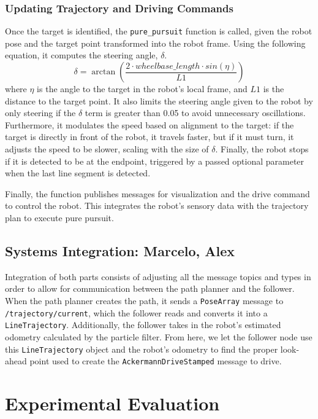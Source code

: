 \documentclass{article}
\begin{document}
\subsubsection{Updating Trajectory and Driving Commands}
Once the target is identified, the \texttt{pure\_pursuit} function is called, given the robot pose and the target point transformed into the robot frame. Using the following equation, it computes the steering angle, $\delta$.
$$\delta = \arctan(\frac{2 \cdot wheelbase\_length \cdot 
sin(\eta)}{L1})$$
where $\eta$  is the angle to the target in the robot's local frame, and $L1$ is the distance to the target point. It also limits the steering angle given to the robot by only steering if the $\delta$ term is greater than 0.05 to avoid unnecessary oscillations. Furthermore, it modulates the speed based on alignment to the target: if the target is directly in front of the robot, it travels faster, but if it must turn, it adjusts the speed to be slower, scaling with the size of $\delta$. Finally, the robot stops if it is detected to be at the endpoint, triggered by a passed optional parameter when the last line segment is detected. 

Finally, the function publishes messages for visualization and the drive command to control the robot. This integrates the robot's sensory data with the trajectory plan to execute pure pursuit. 


\subsection{Systems Integration: Marcelo, Alex}

Integration of both parts consists of adjusting all the message topics and types in order to allow for communication between the path planner and the follower. When the path planner creates the path, it sends a \texttt{PoseArray} message to \texttt{/trajectory/current}, which the follower reads and converts it into a \texttt{LineTrajectory}. Additionally, the follower takes in the robot's estimated odometry calculated by the particle filter. From here, we let the follower node use this \texttt{LineTrajectory} object and the robot's odometry to find the proper look-ahead point used to create the \texttt{AckermannDriveStamped} message to drive.

\section{Experimental Evaluation}
\end{document}
